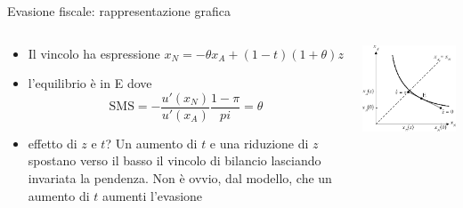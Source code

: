 \documentclass[11pt]{beamer}
\begin{document}
\begin{frame}{Evasione fiscale: rappresentazione grafica}
\begin{columns}
\begin{column}{.45\columnwidth}
\begin{itemize}
\item Il vincolo ha espressione $x_N=-\theta x_A+(1-t)(1+\theta)z$
\item l'equilibrio è in E dove
\begin{equation*}
 \text{SMS} = - \frac{u'(x_N)}{u'(x_A)}\frac{1-\pi}{pi}=\theta
\end{equation*}
\item effetto di $z$ e $t$? Un aumento di $t$ e una riduzione di $z$ spostano verso il basso il vincolo di bilancio lasciando invariata la pendenza. Non è ovvio, dal modello, che un aumento di $t$ aumenti l'evasione
\end{itemize}
\end{column}
\begin{column}{.55\columnwidth}
\begin{center}
\includegraphics[width=\textwidth]{./figure/evasione-2.pdf}
\end{center}
\end{column}
\end{columns}
\end{frame}
\end{document}
